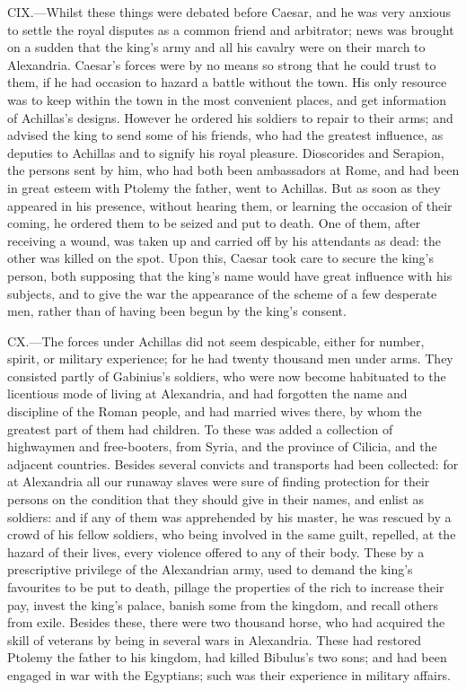 CIX.—Whilst these things were debated before Caesar, and he was very
anxious to settle the royal disputes as a common friend and arbitrator;
news was brought on a sudden that the king's army and all his cavalry
were on their march to Alexandria. Caesar's forces were by no means so
strong that he could trust to them, if he had occasion to hazard a
battle without the town. His only resource was to keep within the town
in the most convenient places, and get information of Achillas's
designs. However he ordered his soldiers to repair to their arms; and
advised the king to send some of his friends, who had the greatest
influence, as deputies to Achillas and to signify his royal pleasure.
Dioscorides and Serapion, the persons sent by him, who had both been
ambassadors at Rome, and had been in great esteem with Ptolemy the
father, went to Achillas. But as soon as they appeared in his presence,
without hearing them, or learning the occasion of their coming, he
ordered them to be seized and put to death. One of them, after receiving
a wound, was taken up and carried off by his attendants as dead: the
other was killed on the spot. Upon this, Caesar took care to secure the
king's person, both supposing that the king's name would have great
influence with his subjects, and to give the war the appearance of the
scheme of a few desperate men, rather than of having been begun by the
king's consent.

CX.—The forces under Achillas did not seem despicable, either for
number, spirit, or military experience; for he had twenty thousand men
under arms. They consisted partly of Gabinius's soldiers, who were now
become habituated to the licentious mode of living at Alexandria, and
had forgotten the name and discipline of the Roman people, and had
married wives there, by whom the greatest part of them had children. To
these was added a collection of highwaymen and free-booters, from Syria,
and the province of Cilicia, and the adjacent countries. Besides several
convicts and transports had been collected: for at Alexandria all our
runaway slaves were sure of finding protection for their persons on the
condition that they should give in their names, and enlist as soldiers:
and if any of them was apprehended by his master, he was rescued by a
crowd of his fellow soldiers, who being involved in the same guilt,
repelled, at the hazard of their lives, every violence offered to any of
their body. These by a prescriptive privilege of the Alexandrian army,
used to demand the king's favourites to be put to death, pillage the
properties of the rich to increase their pay, invest the king's palace,
banish some from the kingdom, and recall others from exile. Besides
these, there were two thousand horse, who had acquired the skill of
veterans by being in several wars in Alexandria. These had restored
Ptolemy the father to his kingdom, had killed Bibulus's two sons; and
had been engaged in war with the Egyptians; such was their experience in
military affairs.

